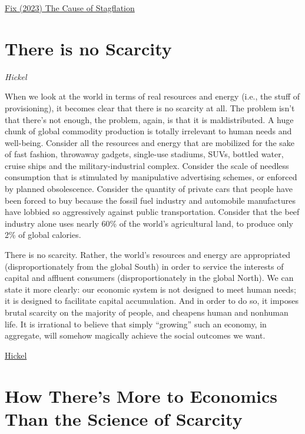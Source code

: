 \documentclass[
]{book}
\begin{document}
\href{https://economicsfromthetopdown.com/2023/01/26/the-cause-of-stagflation/}{Fix (2023) The Cause of Stagflation}

\hypertarget{there-is-no-scarcity}{%
\section{There is no Scarcity}\label{there-is-no-scarcity}}

\emph{Hickel}

When we look at the world in terms of real resources and energy (i.e., the stuff of provisioning), it becomes clear that there is no scarcity at all. The problem isn't that there's not enough, the problem, again, is that it is maldistributed. A huge chunk of global commodity production is totally irrelevant to human needs and well-being. Consider all the resources and energy that are mobilized for the sake of fast fashion, throwaway gadgets, single-use stadiums, SUVs, bottled water, cruise ships and the military-industrial complex. Consider the scale of needless consumption that is stimulated by manipulative advertising schemes, or enforced by planned obsolescence. Consider the quantity of private cars that people have been forced to buy because the fossil fuel industry and automobile manufactures have lobbied so aggressively against public transportation. Consider that the beef industry alone uses nearly 60\% of the world's agricultural land, to produce only 2\% of global calories.

There is no scarcity. Rather, the world's resources and energy are appropriated (disproportionately from the global South) in order to service the interests of capital and affluent consumers (disproportionately in the global North). We can state it more clearly: our economic system is not designed to meet human needs; it is designed to facilitate capital accumulation. And in order to do so, it imposes brutal scarcity on the majority of people, and cheapens human and nonhuman life. It is irrational to believe that simply ``growing'' such an economy, in aggregate, will somehow magically achieve the social outcomes we want.

\href{https://www.jasonhickel.org/blog/2021/2/21/is-the-world-poor-or-unjust}{Hickel}

\hypertarget{how-theres-more-to-economics-than-the-science-of-scarcity}{%
\section{How There's More to Economics Than the Science of Scarcity}\label{how-theres-more-to-economics-than-the-science-of-scarcity}}
\end{document}
